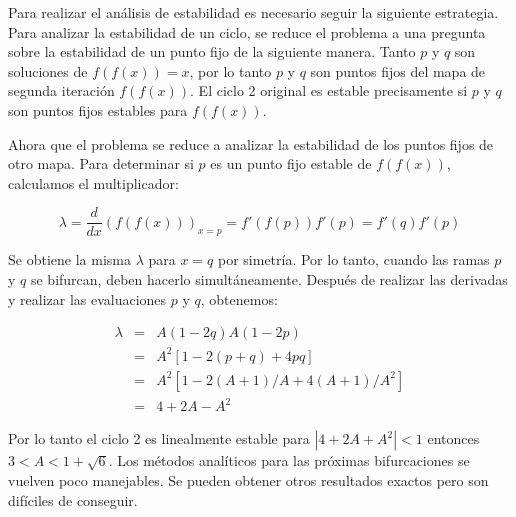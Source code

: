              Para realizar el análisis de estabilidad es necesario seguir la siguiente estrategia. Para analizar la estabilidad de un ciclo, se reduce el problema a una pregunta sobre la estabilidad de un punto fijo de la siguiente manera. Tanto $p$ y $q$ son soluciones de $f(f(x)) = x$, por lo tanto $p$ y $q$ son puntos fijos del mapa de segunda iteración $f(f(x))$. El ciclo 2 original es estable precisamente si $p$ y $q$ son puntos fijos estables para $f(f(x))$.

            Ahora que el problema se reduce a analizar la estabilidad de los puntos fijos de otro mapa. Para determinar si $p$ es un punto fijo estable de $f(f(x))$, calculamos el multiplicador:

            \begin{equation}
                \lambda = \frac{d}{dx} ( f( f(x) ) )_{x=p} = f'(f(p))f'(p) = f'(q)f'(p)
            \end{equation}

            Se obtiene la misma $\lambda$ para $x = q$ por simetría. Por lo tanto, cuando las ramas $p$ y $q$ se bifurcan, deben hacerlo simultáneamente. Después de realizar las derivadas y realizar las evaluaciones $p$ y $q$, obtenemos:

            \begin{eqnarray}
                \lambda & = & A(1-2q) A(1-2p)\\
                    & = & A^{2} [1 - 2(p+q) + 4 pq]\\
                    & = & A^{2} [1 - 2 (A+1)/A + 4(A+1)/A^{2}] \\
                    & = & 4 + 2 A - A^{2}
            \end{eqnarray}

            Por lo tanto el ciclo 2 es linealmente estable para $|4 + 2A + A^{2}| < 1$ entonces $3 < A < 1 + \sqrt{6}$. Los métodos analíticos para las próximas bifurcaciones se vuelven poco manejables. Se pueden obtener otros resultados exactos pero son difíciles de conseguir. 

